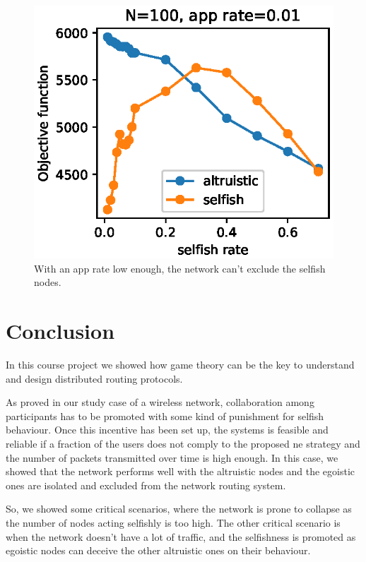 \documentclass[conference,10.5pt]{IEEEtran}
\begin{document}
\begin{figure}
  \includegraphics{figures/obj_func_vs_selfish_rate_parabola.eps}
  \caption{With an app rate low enough, the network can't exclude the selfish nodes.}
  \label{fig:parabola}
\end{figure}

\section{Conclusion}

In this course project we showed how game theory can be the key to understand and design distributed routing protocols.

As proved in our study case of a wireless network, collaboration among participants has to be promoted with some kind of punishment for selfish behaviour.
Once this incentive has been set up, the systems is feasible and reliable if a fraction of the users does not comply to the proposed \gls{ne} strategy and the number of packets transmitted over time is high enough. In this case, we showed that the network performs well with the altruistic nodes and the egoistic ones are isolated and excluded from the network routing system.

So, we showed some critical scenarios, where the network is prone to collapse as the number of nodes acting selfishly is too high. The other critical scenario is when the network doesn't have a lot of traffic, and the selfishness is promoted as egoistic nodes can deceive the other altruistic ones on their behaviour.


\nocite{*}


\end{document}
